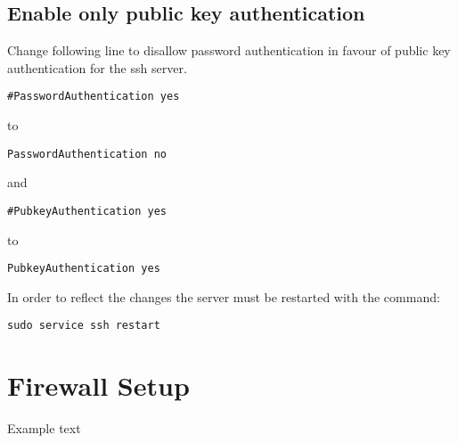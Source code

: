 \documentclass[10pt,a4paper]{article}
\begin{document}
\subsection{Enable only public key authentication}
Change following line to disallow password authentication in favour of public key authentication for the ssh server.

\begin{verbatim}
#PasswordAuthentication yes
\end{verbatim}
to
\begin{verbatim}
PasswordAuthentication no
\end{verbatim}
and
\begin{verbatim}
#PubkeyAuthentication yes
\end{verbatim}
to
\begin{verbatim}
PubkeyAuthentication yes
\end{verbatim}

In order to reflect the changes the server must be restarted with the command:
\begin{verbatim}
sudo service ssh restart
\end{verbatim}

\newpage
\section{Firewall Setup}
Example text
\end{document}
